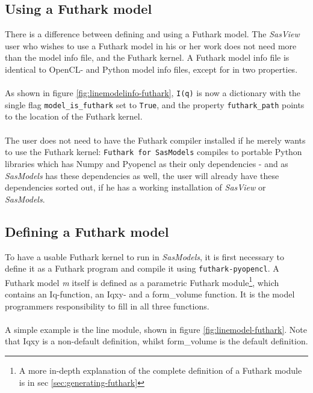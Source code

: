 \documentclass[11pt]{article}
\newcommand{\sasmodels}{\textit{SasModels}}
\newcommand{\sasview}{\textit{SasView}}
\newcommand{\iq}{\texttt{I(q)}}
\newcommand{\futhark}{\texttt{Futhark for SasModels}}
\begin{document}
\subsection{Using a Futhark model}
\label{sec:using-futhark}
There is a difference between defining and using a Futhark model.
The \sasview{} user who wishes to use a Futhark model in his or her work does 
not need more than the model info file, and the Futhark kernel.
A Futhark model info file is identical to OpenCL- 
and Python model info files, except for in two properties.
\\\\
As shown in figure \ref{fig:linemodelinfo-futhark}, \iq{} is now a dictionary
with the single flag \texttt{model\_is\_futhark} set to \texttt{True},
and the property \texttt{futhark\_path} points to the location of the Futhark kernel.
\\\\
The user does not need to have the Futhark compiler installed if he merely wants
to use the Futhark kernel: \futhark{} compiles to portable Python libraries which 
has Numpy and Pyopencl as their only dependencies - and as \sasmodels{} has these 
dependencies as well, the user will already have these dependencies sorted out, 
if he has a working installation of \sasview{} or \sasmodels{}.

\subsection{Defining a Futhark model}
\label{sec:defining-futhark-model}
To have a usable Futhark kernel to run in \sasmodels, it is first necessary to
define it as a Futhark program and compile it using \texttt{futhark-pyopencl}.
A Futhark model \textit{m} itself is defined as a parametric Futhark module\footnote{
  A more in-depth explanation of the complete definition of a Futhark module is 
  in sec \ref{sec:generating-futhark}},
which contains an Iq-function, an Iqxy- and a form\_volume function.
It is the model programmers responsibility to fill in all three functions.
\\\\
A simple example is the line module, shown in figure \ref{fig:linemodel-futhark}.
Note that Iqxy is a non-default definition, whilst form\_volume is the default 
definition.
\end{document}
